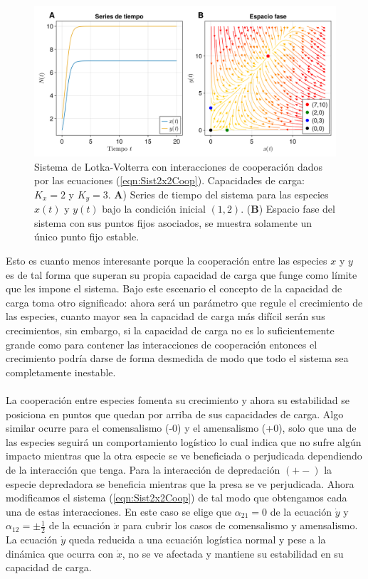 \begin{ejemplo}
	\begin{figure}[h!]
		\centering
		\includegraphics[scale=0.24]{../Imagenes/Cooperacion de especies}
		\caption{Sistema de Lotka-Volterra con interacciones de cooperación dados por las ecuaciones (\ref{eqn:Sist2x2Coop}). Capacidades de carga: $K_x=2$ y $K_y=3$. \textbf{A}) Series de tiempo del sistema para las especies $x(t)$ y $y(t)$ bajo la condición inicial $(1,2)$. (\textbf{B}) Espacio fase del sistema con sus puntos fijos asociados, se muestra solamente un único punto fijo estable.}
		\label{fig:CooperacionEspecies}
	\end{figure}
	 Esto es cuanto menos interesante porque la cooperación entre las especies $x$ y $y$ es de tal forma que superan su propia capacidad de carga que funge como límite que les impone el sistema. Bajo este escenario el concepto de la capacidad de carga toma otro significado: ahora será un parámetro que regule el crecimiento de las especies, cuanto mayor sea la capacidad de carga más difícil serán sus crecimientos, sin embargo, si la capacidad de carga no es lo suficientemente grande como para contener las interacciones de cooperación entonces el crecimiento podría darse de forma desmedida de modo que todo el sistema sea completamente inestable.\\
	 \\
 	La cooperación entre especies fomenta su crecimiento y ahora su estabilidad se posiciona en puntos que quedan por arriba de sus capacidades de carga. Algo similar ocurre para el comensalismo (-0) y el amensalismo (+0), solo que una de las especies seguirá un comportamiento logístico lo cual indica que no sufre algún impacto mientras que la otra especie se ve beneficiada o perjudicada dependiendo de la interacción que tenga. Para la interacción de depredación $(+-)$ la especie depredadora se beneficia mientras que la presa se ve perjudicada.
 	\newpage
 	Ahora modificamos el sistema (\ref{eqn:Sist2x2Coop}) de tal modo que obtengamos cada una de estas interacciones. En este caso se elige que $\alpha_{21}=0$ de la ecuación $\dot{y}$ y $\alpha_{12}=\pm\frac{1}{2}$ de la ecuación $\dot{x}$ para cubrir los casos de comensalismo y amensalismo. La ecuación $\dot{y}$ queda reducida a una ecuación logística normal y pese a la dinámica que ocurra con $\dot{x}$, no se ve afectada y mantiene su estabilidad en su capacidad de carga. 

\end{ejemplo}
